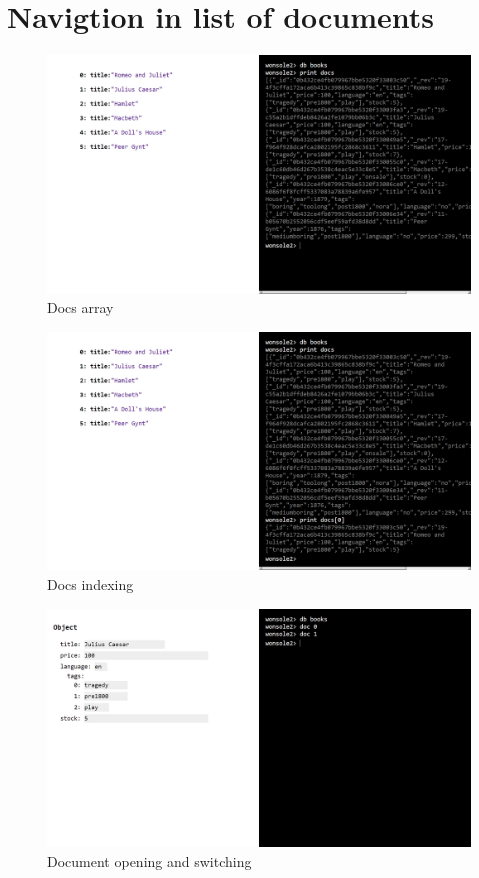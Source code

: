 \documentclass[10pt,a4paper,oneside]{report}
\begin{document}
\section{Navigtion in list of documents}

\begin{figure}
\centering
\includegraphics[width=\textwidth]{screenshot/wonsole2/wonsole2-24.png}
\caption{Docs array}
\label{wonsole2-24}
\end{figure}


\begin{figure}
\centering
\includegraphics[width=\textwidth]{screenshot/wonsole2/wonsole2-26.png}
\caption{Docs indexing}
\label{wonsole2-26}
\end{figure}


\begin{figure}
\centering
\includegraphics[width=\textwidth]{screenshot/wonsole2/wonsole2-30.png}
\caption{Document opening and switching}
\label{wonsole2-30}
\end{figure}
\end{document}
